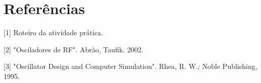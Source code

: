 \newpage
\section{Referências}

[1] Roteiro da atividade prática.
\vspace{0.5cm}

[2] "Osciladores de RF". Abrão, Taufik. 2002.
\vspace{0.5cm}

[3] "Oscillator Design and Computer Simulation".  Rhea, R. W.; Noble Publishing, 1995.